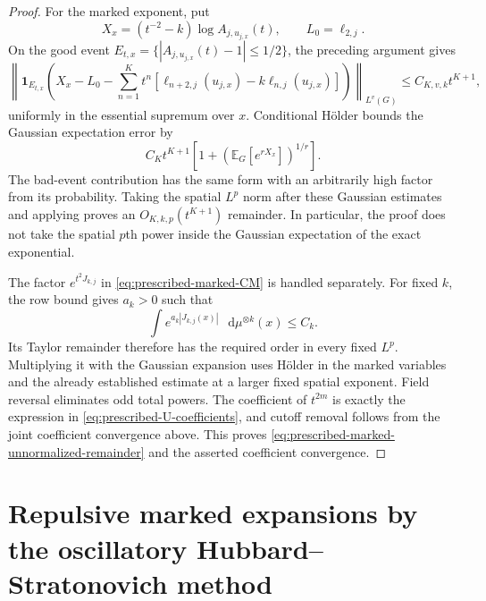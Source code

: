 \documentclass[11pt,reqno]{amsart}
\numberwithin{equation}{section}
\theoremstyle{plain}
\theoremstyle{definition}
\newcommand{\dd}{\mathop{}\!\mathrm d}
\newcommand{\E}{\mathbb E}
\newcommand{\one}{\mathbf 1}
\begin{document}
\begin{proof}
For the marked exponent, put
\begin{equation}
 X_x=(t^{-2}-k)\log A_{j,u_{j,x}}(t),
 \qquad
 L_0=\ell_{2,j}.
 \label{eq:prescribed-marked-X}
\end{equation}
On the good event $E_{t,x}=\{|A_{j,u_{j,x}}(t)-1|\leq1/2\}$, the preceding argument gives
\begin{equation}
 \left\|\one_{E_{t,x}}\left(
 X_x-L_0-\sum_{n=1}^Kt^n[\ell_{n+2,j}(u_{j,x})-k\ell_{n,j}(u_{j,x})]
 \right)\right\|_{L^v(G)}
 \leq C_{K,v,k}t^{K+1},
 \label{eq:prescribed-marked-log-error}
\end{equation}
uniformly in the essential supremum over $x$.  Conditional H\"older bounds the Gaussian expectation error by
\begin{equation}
 C_Kt^{K+1}\left[1+(\E_G[e^{rX_x}])^{1/r}\right].
 \label{eq:prescribed-conditional-error}
\end{equation}
The bad-event contribution has the same form with an arbitrarily high factor from its probability.  Taking the spatial $L^p$ norm after these Gaussian estimates and applying  proves an $O_{K,k,p}(t^{K+1})$ remainder.  In particular, the proof does not take the spatial $p$th power inside the Gaussian expectation of the exact exponential.

The factor $e^{t^2J_{k,j}}$ in \eqref{eq:prescribed-marked-CM} is handled separately.  For fixed $k$, the row bound gives $a_k>0$ such that
\begin{equation}
 \int e^{a_k|J_{k,j}(x)|}\,\dd\mu^{\otimes k}(x)\leq C_k.
 \label{eq:prescribed-external-moments}
\end{equation}
Its Taylor remainder therefore has the required order in every fixed $L^p$.  Multiplying it with the Gaussian expansion uses H\"older in the marked variables and the already established estimate at a larger fixed spatial exponent.  Field reversal eliminates odd total powers.  The coefficient of $t^{2m}$ is exactly the expression in \eqref{eq:prescribed-U-coefficients}, and cutoff removal follows from the joint coefficient convergence above.  This proves \eqref{eq:prescribed-marked-unnormalized-remainder} and the asserted coefficient convergence.
\end{proof}

\section{Repulsive marked expansions by the oscillatory Hubbard--Stratonovich method}
\label{app:repulsive-marked-oscillatory}
\end{document}
